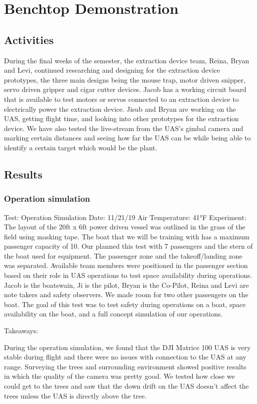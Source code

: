 \documentclass{wrcecapstone}
\begin{document}
\section{Benchtop Demonstration}
\subsection{Activities}
During the final weeks of the semester, the extraction device team, Reina, Bryan and Levi, continued researching and designing for the extraction device prototypes, the three main designs being the mouse trap, motor driven snipper, servo driven gripper and cigar cutter devices. Jacob has a working circuit board that is available to test motors or servos connected to an extraction device to electrically power the extraction device. Jisub and Bryan are working on the UAS, getting flight time, and looking into other prototypes for the extraction device. We have also tested the live-stream from the UAS’s gimbal camera and marking certain distances and seeing how far the UAS can be while being able to identify a certain target which would be the plant. 
        
\subsection{Results}
\subsubsection{Operation simulation}
Test: Operation Simulation
Date: 11/21/19
Air Temperature: 41°F
Experiment: The layout of the 20ft x 6ft power driven vessel was outlined in the grass of the field using masking tape. The boat that we will be training with has a maximum passenger capacity of 10. Our planned this test with 7 passengers and the stern of the boat used for equipment. The passenger zone and the takeoff/landing zone was separated.  Available team members were positioned in the passenger section based on their role in UAS operations to test space availability during operations. Jacob is the boatswain, Ji is the pilot, Bryan is the Co-Pilot, Reina and Levi are note takers and safety observers. We made room for two other passengers on the boat. The goal of this test was to test safety during operations on a boat, space availability on the boat, and a full concept simulation of our operations.

Takeaways: 

During the operation simulation, we found that the DJI Matrice 100 UAS is very stable during flight and there were no issues with connection to the UAS at any range. Surveying the trees and surrounding environment showed positive results in which the quality of the camera was pretty good. We tested how close we could get to the trees and saw that the down drift on the UAS doesn’t affect the trees unless the UAS is directly above the tree. 
\end{document}
